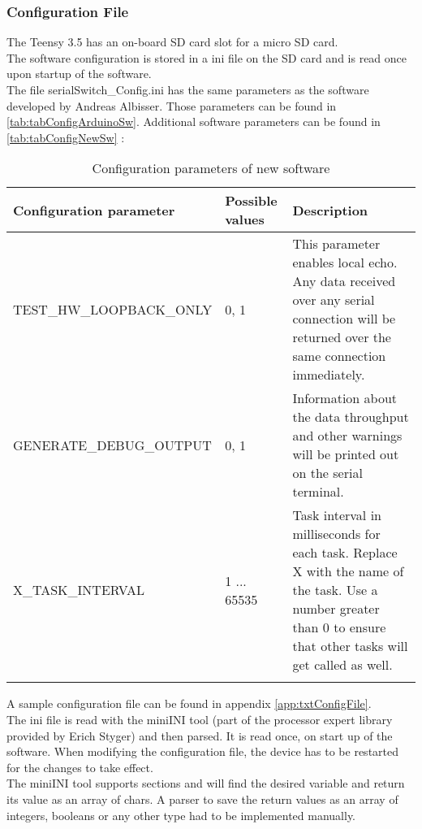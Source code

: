 \subsubsection{Configuration File}
The Teensy 3.5 has an on-board SD card slot for a micro SD card.\\
The software configuration is stored in a ini file on the SD card and is read once upon startup of the software.\\
The file serialSwitch\_Config.ini has the same parameters as the software developed by Andreas Albisser. Those parameters can be found in \autoref{tab:tabConfigArduinoSw}. Additional software parameters can be found in \autoref{tab:tabConfigNewSw} :\\
\begin{center}
    \begin{longtable}{p{6cm}p{1cm}p{7cm}}
        \hline
        \textbf{Configuration parameter} & \textbf{Possible values} & \textbf{Description} \\
        \hline
        TEST\_HW\_LOOPBACK\_ONLY & 0, 1 & 
        This parameter enables local echo. Any data received over any serial connection will be returned over the same connection immediately.\\
        \hline
        GENERATE\_DEBUG\_OUTPUT &  0, 1 & 
        Information about the data throughput and other warnings will be printed out on the serial terminal.\\
        \hline
        X\_TASK\_INTERVAL &  1 ... 65535 & 
        Task interval in milliseconds for each task. Replace X with the name of the task. Use a number greater than 0 to ensure that other tasks will get called as well. \\
        \hline
        \caption{Configuration parameters of new software}
        \label{tab:tabConfigNewSw}    
    \end{longtable}
\end{center}
A sample configuration file can be found in appendix \autoref{app:txtConfigFile}.\\
The ini file is read with the miniINI tool (part of the processor expert library provided by Erich Styger) and then parsed. It is read once, on start up of the software. When modifying the configuration file, the device has to be restarted for the changes to take effect.\\
The miniINI tool supports sections and will find the desired variable and return its value as an array of chars. A parser to save the return values as an array of integers, booleans or any other type had to be implemented manually.
%
